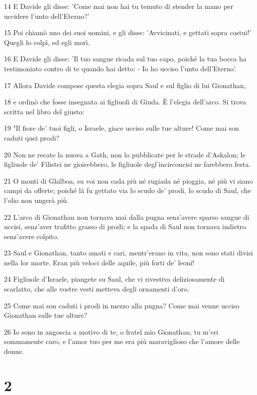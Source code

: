 \par 14 E Davide gli disse: 'Come mai non hai tu temuto di stender la mano per uccidere l'unto dell'Eterno?'
\par 15 Poi chiamò uno dei suoi uomini, e gli disse: 'Avvicinati, e gettati sopra costui!' Quegli lo colpì, ed egli morì.
\par 16 E Davide gli disse: 'Il tuo sangue ricada sul tuo capo, poiché la tua bocca ha testimoniato contro di te quando hai detto: - Io ho ucciso l'unto dell'Eterno'.
\par 17 Allora Davide compose questa elegia sopra Saul e sul figlio di lui Gionathan,
\par 18 e ordinò che fosse insegnata ai figliuoli di Giuda. È l'elegia dell'arco. Si trova scritta nel libro del giusto:
\par 19 "Il fiore de' tuoi figli, o Israele, giace ucciso sulle tue alture! Come mai son caduti quei prodi?
\par 20 Non ne recate la nuova a Gath, non lo pubblicate per le strade d'Askalon; le figliuole de' Filistei ne gioirebbero, le figliuole degl'incirconcisi ne farebbero festa.
\par 21 O monti di Ghilboa, su voi non cada più né rugiada né pioggia, né più vi siano campi da offerte; poiché là fu gettato via lo scudo de' prodi, lo scudo di Saul, che l'olio non ungerà più.
\par 22 L'arco di Gionathan non tornava mai dalla pugna senz'avere sparso sangue di uccisi, senz'aver trafitto grasso di prodi; e la spada di Saul non tornava indietro senz'avere colpito.
\par 23 Saul e Gionathan, tanto amati e cari, mentr'erano in vita, non sono stati divisi nella lor morte. Eran più veloci delle aquile, più forti de' leoni!
\par 24 Figliuole d'Israele, piangete su Saul, che vi rivestiva deliziosamente di scarlatto, che alle vostre vesti metteva degli ornamenti d'oro.
\par 25 Come mai son caduti i prodi in mezzo alla pugna? Come mai venne ucciso Gionathan sulle tue alture?
\par 26 Io sono in angoscia a motivo di te, o fratel mio Gionathan; tu m'eri sommamente caro, e l'amor tuo per me era più maraviglioso che l'amore delle donne.

\chapter{2}

